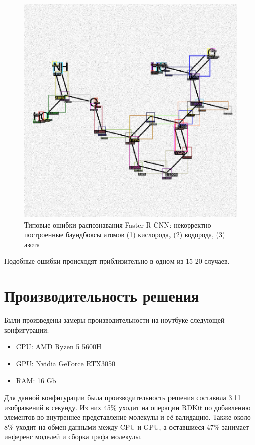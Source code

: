 \begin{figure}[h!]
	\includegraphics [scale=0.28] {my_folder/images/inference3}
	\caption{Типовые ошибки распознавания Faster R-CNN: некорректно построенные баундбоксы атомов (1) кислорода, (2) водорода, (3) азота}
	\label{fig:mistake}
\end{figure}

Подобные ошибки происходят приблизительно в одном из 15-20 случаев.

\section{Производительность решения} \label{ch3:sec4}

Были произведены замеры производительности на ноутбуке следующей конфигурации:

\begin{itemize}
	\item CPU: AMD Ryzen 5 5600H
	\item GPU: Nvidia GeForce RTX3050
	\item RAM: 16 Gb
\end{itemize}

Для данной конфигурации была производительность решения составила 3.11 изображений в секунду. Из них 45\% уходит на операции RDKit по добавлению элементов во внутреннее представление молекулы и её валидацию. Также около 8\% уходит на обмен данными между CPU и GPU, а оставшиеся 47\% занимает инференс моделей и сборка графа молекулы.




%
